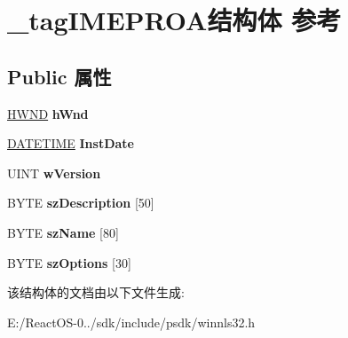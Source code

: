 \hypertarget{struct__tag_i_m_e_p_r_o_a}{}\section{\+\_\+tag\+I\+M\+E\+P\+R\+O\+A结构体 参考}
\label{struct__tag_i_m_e_p_r_o_a}
\subsection*{Public 属性}
\begin{DoxyCompactItemize}
\item 
\mbox{\label{struct__tag_i_m_e_p_r_o_a_a9ca1492a026507a4e31a8e1bdfc668d0}} 
\hyperlink{interfacevoid}{H\+W\+ND} {\bfseries h\+Wnd}
\item 
\mbox{\label{struct__tag_i_m_e_p_r_o_a_ac88430cde36a888627f1aead018b0520}} 
\hyperlink{struct__tag_d_a_t_e_t_i_m_e}{D\+A\+T\+E\+T\+I\+ME} {\bfseries Inst\+Date}
\item 
\mbox{\label{struct__tag_i_m_e_p_r_o_a_ab6e9cdc1fee82c73911be5699a66091d}} 
U\+I\+NT {\bfseries w\+Version}
\item 
\mbox{\label{struct__tag_i_m_e_p_r_o_a_a0ab485995526e0dbc4c19b0e4dfb3404}} 
B\+Y\+TE {\bfseries sz\+Description} \mbox{[}50\mbox{]}
\item 
\mbox{\label{struct__tag_i_m_e_p_r_o_a_a184dbd5f076cee22813a6031657d14a0}} 
B\+Y\+TE {\bfseries sz\+Name} \mbox{[}80\mbox{]}
\item 
\mbox{\label{struct__tag_i_m_e_p_r_o_a_a32fa9c08b637d860716de59c0405e11f}} 
B\+Y\+TE {\bfseries sz\+Options} \mbox{[}30\mbox{]}
\end{DoxyCompactItemize}


该结构体的文档由以下文件生成\+:\begin{DoxyCompactItemize}
\item 
E\+:/\+React\+O\+S-\/0../sdk/include/psdk/winnls32.\+h\end{DoxyCompactItemize}
